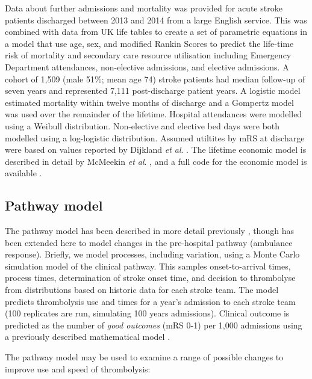Data about further admissions and mortality was provided for acute stroke patients discharged between 2013 and 2014 from a large English service.  This was combined with data from UK life tables to create a set of parametric equations in a model that use age, sex, and modified Rankin Scores to predict the life-time risk of mortality and secondary care resource utilisation including Emergency Department attendances, non-elective admissions, and elective admissions. A cohort of 1,509 (male 51\%; mean age 74) stroke patients had median follow-up of seven years and represented 7,111 post-discharge patient years.  A logistic model estimated mortality within twelve months of discharge and a Gompertz model was used over the remainder of the lifetime. Hospital attendances were modelled using a Weibull distribution. Non-elective and elective bed days were both modelled using a log-logistic distribution. Assumed utiltites by mRS at discharge were based on values reported by Dijkland \textit{et al}. \cite{dijkland_utility-weighted_2018}. The lifetime economic model is described in detail by McMeekin \textit{et al}. \cite{mcmeekin_lifetime_2024}, and a full code for the economic model is available \cite{laws_stroke-optimiststreamlit_lifetime_stroke_2024}.

\subsection{Pathway model}

The pathway model has been described in more detail previously \cite{allen_use_2022}, though has been extended here to model changes in the pre-hospital pathway (ambulance response). Briefly, we model processes, including variation, using a Monte Carlo simulation model of the clinical pathway. This samples onset-to-arrival times, process times, determination of stroke onset time, and decision to thrombolyse from distributions based on historic data for each stroke team. The model predicts thrombolysis use and times for a year's admission to each stroke team (100 replicates are run, simulating 100 years admissions). Clinical outcome is predicted as the number of \textit{good outcomes} (mRS 0-1) per 1,000 admissions using a previously described mathematical model \cite{allen_estimation_2020}.

The pathway model may be used to examine a range of possible changes to improve use and speed of thrombolysis:

